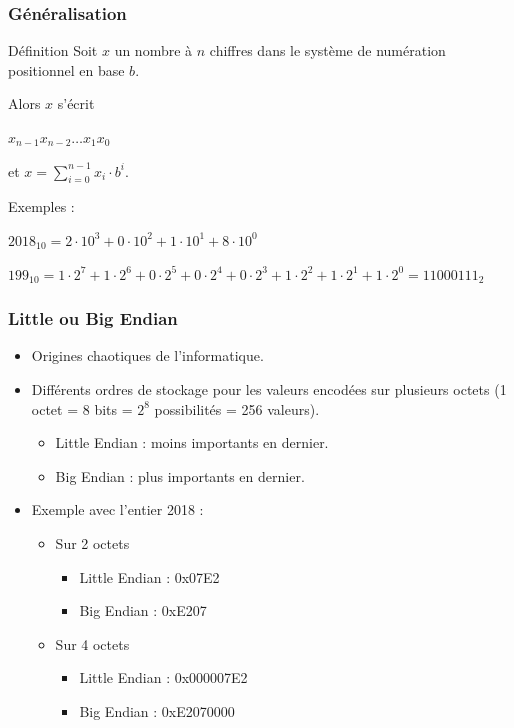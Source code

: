 	\frame
	{
		\frametitle{G\'en\'eralisation}
		\begin{block}{D\'efinition}
			Soit $x$ un nombre \`a $n$ chiffres dans le syst\`eme de num\'eration positionnel en base $b$.
			
			Alors $x$ s'\'ecrit
			
			$x_{n-1}x_{n-2}\ldots x_1x_0$
			
			et $x=\sum\limits_{i = 0}^{n-1}x_i\cdot b^i$.
		\end{block}
		
		Exemples :
		\begin{description}
			\item $2018_{10} = 2\cdot10^3 + 0\cdot10^2 + 1\cdot10^1+8\cdot10^0$
			\item $199_{10} = 1\cdot2^7 + 1\cdot2^6 + 0\cdot2^5+0\cdot2^4 + 0\cdot2^3 + 1\cdot2^2 + 1\cdot2^1+1\cdot2^0 = 11000111_2$
		\end{description}
	}

\frame
{
	\frametitle{Little ou Big Endian}
	\begin{itemize}
		\item Origines chaotiques de l'informatique.
		\item Diff\'erents ordres de stockage pour les valeurs encod\'ees sur plusieurs octets (1 octet = 8 bits = $2^8$ possibilit\'es = 256 valeurs).
		\begin{itemize}
			\item Little Endian : moins importants en dernier.
			\item Big Endian : plus importants en dernier.
		\end{itemize}
		\item Exemple avec l'entier 2018 :
		\begin{itemize}
			\item Sur 2 octets
			\begin{itemize}
				\item Little Endian : 0x07E2
				\item Big Endian : 0xE207
			\end{itemize}
			\item Sur 4 octets
			\begin{itemize}
				\item Little Endian : 0x000007E2
				\item Big Endian : 0xE2070000
			\end{itemize}
		\end{itemize}
	\end{itemize}
}

